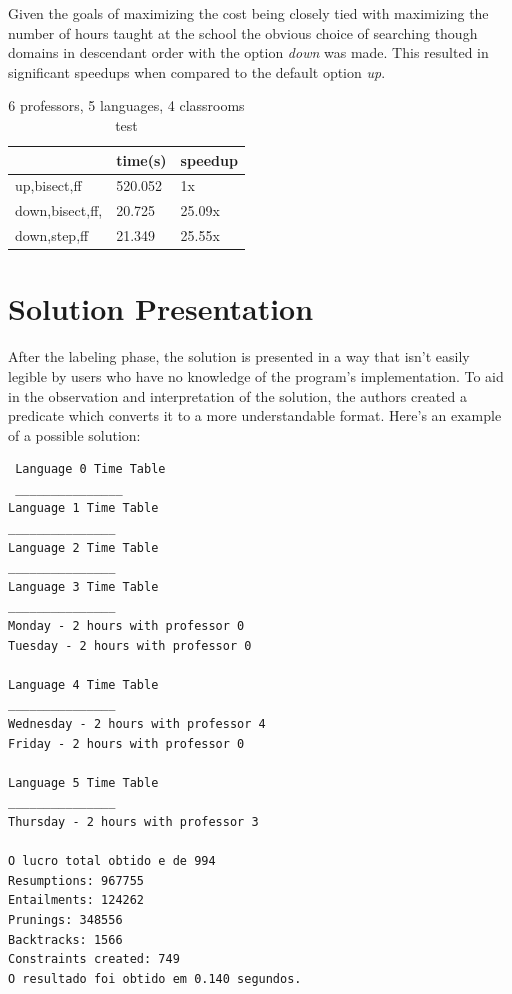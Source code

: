 \documentclass{llncs}
\begin{document}
Given the goals of maximizing the cost being closely tied with maximizing the number of hours taught at the school the obvious choice of searching though domains in descendant order with the option \textit{down} was made. This resulted in significant speedups when compared to the default option \textit{up}.


\begin{table}[]
\caption{6 professors, 5 languages, 4 classrooms test}
\label{table:speedup}
\centering
\begin{tabular}{l|l|l|}
\cline{2-3}
                                      & time(s) & speedup \\ \hline
\multicolumn{1}{|l|}{up,bisect,ff}    & 520.052 & 1x      \\ \hline
\multicolumn{1}{|l|}{down,bisect,ff,} & 20.725  & 25.09x  \\ \hline
\multicolumn{1}{|l|}{down,step,ff}  & 21.349  & 25.55x  \\ \hline
\end{tabular}

\end{table}
 
 \section{Solution Presentation}
 After the labeling phase, the solution is presented in a way that isn't easily legible by users who have no knowledge of the program's implementation. To aid in the observation and interpretation of the solution, the authors created a predicate which converts it to a more understandable format.  Here's an example of a possible solution:
 
 \begin{verbatim}
 Language 0 Time Table
 _______________
Language 1 Time Table
_______________
Language 2 Time Table
_______________
Language 3 Time Table
_______________
Monday - 2 hours with professor 0
Tuesday - 2 hours with professor 0

Language 4 Time Table
_______________
Wednesday - 2 hours with professor 4
Friday - 2 hours with professor 0

Language 5 Time Table
_______________
Thursday - 2 hours with professor 3

O lucro total obtido e de 994
Resumptions: 967755
Entailments: 124262
Prunings: 348556
Backtracks: 1566
Constraints created: 749
O resultado foi obtido em 0.140 segundos.
 \end{verbatim}
 
\end{document}
